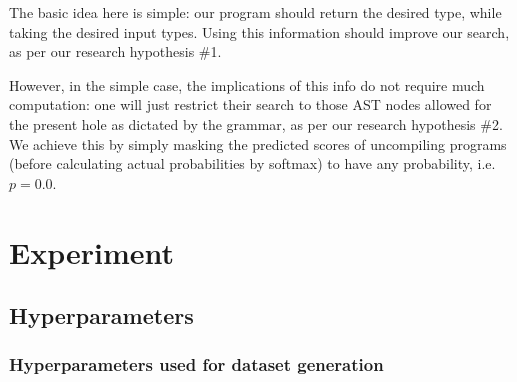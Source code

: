 \documentclass{article}
\begin{document}
The basic idea here is simple: our program should return the desired type, while taking the desired input types.
Using this information should improve our search,
as per our research hypothesis \#1.


However, in the simple case, the implications of this info do not require much computation:
one will just restrict their search to those AST nodes allowed for the present hole as dictated by the grammar,
as per our research hypothesis \#2.
We achieve this by simply masking the predicted scores of uncompiling programs
(before calculating actual probabilities by softmax) to have any probability, i.e. $p=0.0$.


\section{Experiment} \label{sec:experiment}


\subsection{Hyperparameters}

\subsubsection{Hyperparameters used for dataset generation}
\end{document}
